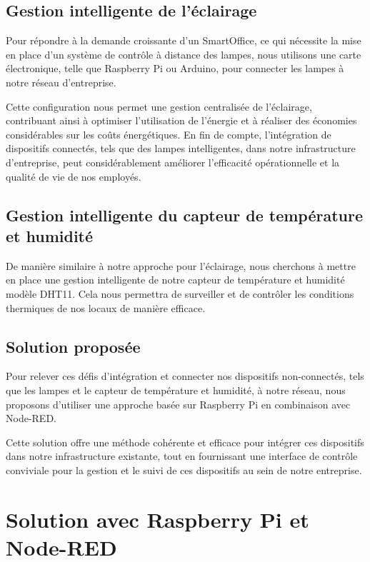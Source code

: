 \subsection{Gestion intelligente de l'éclairage}

Pour répondre à la demande croissante d'un SmartOffice, ce qui nécessite la mise en place d'un système de contrôle à distance des lampes, nous utilisons une carte électronique, telle que Raspberry Pi ou Arduino, pour connecter les lampes à notre réseau d'entreprise. 

Cette configuration nous permet une gestion centralisée de l'éclairage, contribuant ainsi à optimiser l'utilisation de l'énergie et à réaliser des économies considérables sur les coûts énergétiques. En fin de compte, l'intégration de dispositifs connectés, tels que des lampes intelligentes, dans notre infrastructure d'entreprise, peut considérablement améliorer l'efficacité opérationnelle et la qualité de vie de nos employés.

\subsection{Gestion intelligente du capteur de température et humidité}

De manière similaire à notre approche pour l'éclairage, nous cherchons à mettre en place une gestion intelligente de notre capteur de température et humidité modèle DHT11. Cela nous permettra de surveiller et de contrôler les conditions thermiques de nos locaux de manière efficace. 

\subsection{Solution proposée}

Pour relever ces défis d'intégration et connecter nos dispositifs non-connectés, tels que les lampes et le capteur de température et humidité, à notre réseau, nous proposons d'utiliser une approche basée sur Raspberry Pi en combinaison avec Node-RED. 

Cette solution offre une méthode cohérente et efficace pour intégrer ces dispositifs dans notre infrastructure existante, tout en fournissant une interface de contrôle conviviale pour la gestion et le suivi de ces dispositifs au sein de notre entreprise.




\section{Solution avec Raspberry Pi et Node-RED}

